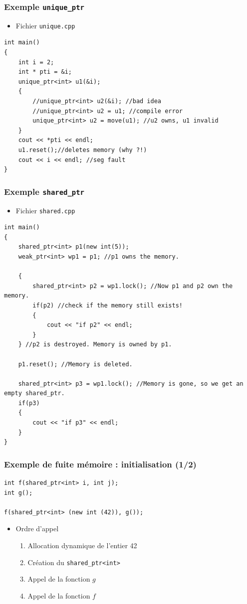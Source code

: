 \begin{frame}[containsverbatim]
\frametitle{Exemple \texttt{unique\_ptr}}
\begin{itemize}
\item Fichier \texttt{unique.cpp}
\end{itemize}
\begin{lstlisting}
int main()
{
	int i = 2;	
	int * pti = &i;
	unique_ptr<int> u1(&i);
	{
		//unique_ptr<int> u2(&i); //bad idea
		//unique_ptr<int> u2 = u1; //compile error
		unique_ptr<int> u2 = move(u1); //u2 owns, u1 invalid
	}
	cout << *pti << endl;
	u1.reset();//deletes memory (why ?!)
	cout << i << endl; //seg fault		
}
\end{lstlisting}
\end{frame}

\begin{frame}[containsverbatim]
\frametitle{Exemple \texttt{shared\_ptr}}
\begin{itemize}
\item Fichier \texttt{shared.cpp}
\end{itemize}
\begin{lstlisting}
int main()
{
	shared_ptr<int> p1(new int(5));
	weak_ptr<int> wp1 = p1; //p1 owns the memory.
	
	{
		shared_ptr<int> p2 = wp1.lock(); //Now p1 and p2 own the memory.
		if(p2) //check if the memory still exists!
		{
		    cout << "if p2" << endl;
		}
	} //p2 is destroyed. Memory is owned by p1.
	
	p1.reset(); //Memory is deleted.
	
	shared_ptr<int> p3 = wp1.lock(); //Memory is gone, so we get an empty shared_ptr.
	if(p3)
	{
		cout << "if p3" << endl;
	}
}
\end{lstlisting}
\end{frame}

\begin{frame}[containsverbatim]
\frametitle{Exemple de fuite mémoire : initialisation (1/2)}
\begin{lstlisting}
int f(shared_ptr<int> i, int j);
int g();

f(shared_ptr<int> (new int (42)), g());
\end{lstlisting}
\begin{itemize}
\item Ordre d'appel
	\begin{enumerate}
	\item Allocation dynamique de l'entier 42
	\item Création du \lstinline|shared_ptr<int>|
	\item Appel de la fonction $g$
	\item Appel de la fonction $f$
	\end{enumerate}
\end{itemize}
\end{frame}

